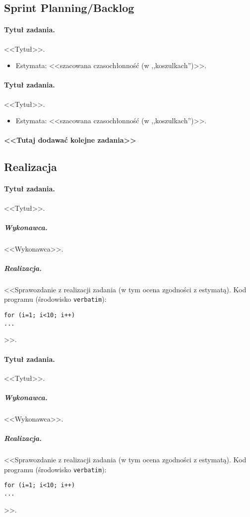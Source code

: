 \documentclass[a4paper]{article}
\begin{document}
\subsection{Sprint Planning/Backlog}

\paragraph{Tytuł zadania.} <<Tytuł>>.
\begin{itemize}
\item Estymata: <<szacowana czasochłonność (w ,,koszulkach'')>>.
\end{itemize}

\paragraph{Tytuł zadania.} <<Tytuł>>.
\begin{itemize}
\item Estymata: <<szacowana czasochłonność (w ,,koszulkach'')>>.
\end{itemize}

\paragraph{<<Tutaj dodawać kolejne zadania>>}

\subsection{Realizacja}

\paragraph{Tytuł zadania.} <<Tytuł>>.
\subparagraph{Wykonawca.} <<Wykonawca>>.
\subparagraph{Realizacja.} <<Sprawozdanie z realizacji zadania (w tym ocena zgodności z estymatą). Kod programu (środowisko \texttt{verbatim}): \begin{verbatim}
for (i=1; i<10; i++)
...
\end{verbatim}>>.

\paragraph{Tytuł zadania.} <<Tytuł>>.
\subparagraph{Wykonawca.} <<Wykonawca>>.
\subparagraph{Realizacja.} <<Sprawozdanie z realizacji zadania (w tym ocena zgodności z estymatą). Kod programu (środowisko \texttt{verbatim}): \begin{verbatim}
for (i=1; i<10; i++)
...
\end{verbatim}>>.
\end{document}
